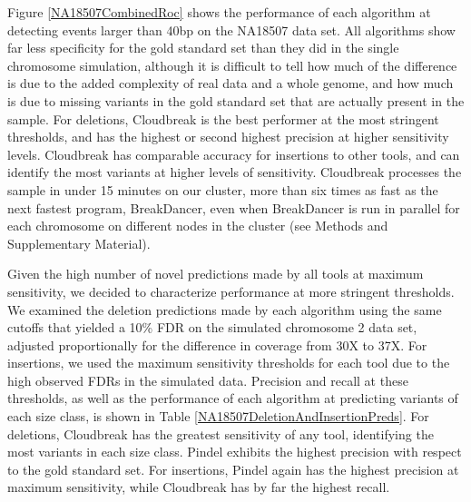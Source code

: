 \documentclass[11pt]{article}
\begin{document}
Figure \ref{NA18507CombinedRoc} shows the performance of each algorithm at detecting events larger than 40bp on the NA18507 data set. All algorithms show far less specificity for the gold standard set than they did in the single chromosome simulation, although it is difficult to tell how much of the difference is due to the added complexity of real data and a whole genome, and how much is due to missing variants in the gold standard set that are actually present in the sample. For deletions, Cloudbreak is the best performer at the most stringent thresholds, and has the highest or second highest precision at higher sensitivity levels. Cloudbreak has comparable accuracy for insertions to other tools, and can identify the most variants at higher levels of sensitivity. Cloudbreak processes the sample in under 15 minutes on our cluster, more than six times as fast as the next fastest program, BreakDancer, even when BreakDancer is run in parallel for each chromosome on different nodes in the cluster (see Methods and Supplementary Material).

Given the high number of novel predictions made by all tools at maximum sensitivity, we decided to characterize performance at more stringent thresholds. We examined the deletion predictions made by each algorithm using the same cutoffs that yielded a 10\% FDR on the simulated chromosome 2 data set, adjusted proportionally for the difference in coverage from 30X to 37X. For insertions, we used the maximum sensitivity thresholds for each tool due to the high observed FDRs in the simulated data. Precision and recall at these thresholds, as well as the performance of each algorithm at predicting variants of each size class, is shown in Table \ref{NA18507DeletionAndInsertionPreds}. For deletions, Cloudbreak has the greatest sensitivity of any tool, identifying the most variants in each size class. Pindel exhibits the highest precision with respect to the gold standard set. For insertions, Pindel again has the highest precision at maximum sensitivity, while Cloudbreak has by far the highest recall.
\end{document}
